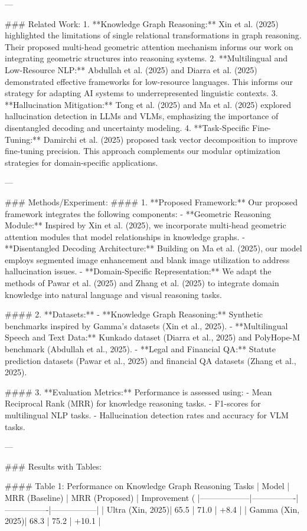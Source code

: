 ---

### Related Work:
1. **Knowledge Graph Reasoning:** Xin et al. (2025) highlighted the limitations of single relational transformations in graph reasoning. Their proposed multi-head geometric attention mechanism informs our work on integrating geometric structures into reasoning systems.
2. **Multilingual and Low-Resource NLP:** Abdullah et al. (2025) and Diarra et al. (2025) demonstrated effective frameworks for low-resource languages. This informs our strategy for adapting AI systems to underrepresented linguistic contexts.
3. **Hallucination Mitigation:** Tong et al. (2025) and Ma et al. (2025) explored hallucination detection in LLMs and VLMs, emphasizing the importance of disentangled decoding and uncertainty modeling.
4. **Task-Specific Fine-Tuning:** Damirchi et al. (2025) proposed task vector decomposition to improve fine-tuning precision. This approach complements our modular optimization strategies for domain-specific applications.

---

### Methods/Experiment:
#### 1. **Proposed Framework:**
Our proposed framework integrates the following components:
- **Geometric Reasoning Module:** Inspired by Xin et al. (2025), we incorporate multi-head geometric attention modules that model relationships in knowledge graphs.
- **Disentangled Decoding Architecture:** Building on Ma et al. (2025), our model employs segmented image enhancement and blank image utilization to address hallucination issues.
- **Domain-Specific Representation:** We adapt the methods of Pawar et al. (2025) and Zhang et al. (2025) to integrate domain knowledge into natural language and visual reasoning tasks.

#### 2. **Datasets:**
- **Knowledge Graph Reasoning:** Synthetic benchmarks inspired by Gamma's datasets (Xin et al., 2025).
- **Multilingual Speech and Text Data:** Kunkado dataset (Diarra et al., 2025) and PolyHope-M benchmark (Abdullah et al., 2025).
- **Legal and Financial QA:** Statute prediction datasets (Pawar et al., 2025) and financial QA datasets (Zhang et al., 2025).

#### 3. **Evaluation Metrics:**
Performance is assessed using:
- Mean Reciprocal Rank (MRR) for knowledge reasoning tasks.
- F1-scores for multilingual NLP tasks.
- Hallucination detection rates and accuracy for VLM tasks.

---

### Results with Tables:

#### Table 1: Performance on Knowledge Graph Reasoning Tasks
| Model            | MRR (Baseline) | MRR (Proposed) | Improvement (%
|------------------|----------------|----------------|-----------------|
| Ultra (Xin, 2025)| 65.5           | 71.0           | +8.4            |
| Gamma (Xin, 2025)| 68.3           | 75.2           | +10.1           |

